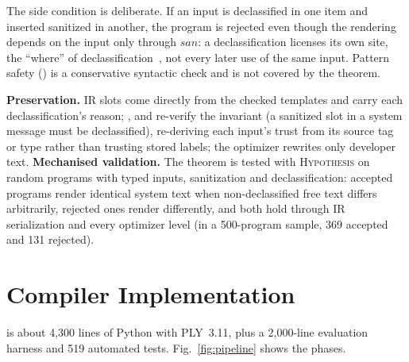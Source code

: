 \documentclass[journal]{IEEEtran}
\begin{document}
The side condition is deliberate. If an input is declassified in one item and inserted sanitized in another, the program is rejected even though the rendering depends on the input only through $\mathit{san}$: a declassification licenses its own site, the ``where'' of declassification~\cite{sabelfeld2009declassification}, not every later use of the same input. Pattern safety () is a conservative syntactic check and is not covered by the theorem.

\textbf{Preservation.} IR slots come directly from the checked templates and carry each declassification's reason; ,  and  re-verify the invariant (a sanitized slot in a system message must be declassified), re-deriving each input's trust from its source tag or type rather than trusting stored labels; the optimizer rewrites only developer text. \textbf{Mechanised validation.} The theorem is tested with \textsc{Hypothesis} on random programs with typed inputs, sanitization and declassification: accepted programs render identical system text when non-declassified free text differs arbitrarily, rejected ones render differently, and both hold through IR serialization and every optimizer level (in a 500-program sample, 369 accepted and 131 rejected).

\section{Compiler Implementation}\label{sec:impl}

\TL{} is about 4{,}300 lines of Python with PLY~3.11, plus a 2{,}000-line evaluation harness and 519 automated tests. Fig.~\ref{fig:pipeline} shows the phases.
\end{document}
